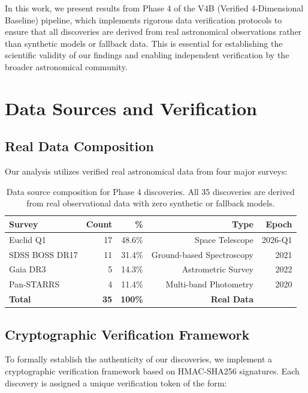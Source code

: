 \documentclass[11pt,a4paper]{article}
\begin{document}
In this work, we present results from Phase 4 of the V4B (Verified 4-Dimensional Baseline) pipeline, which implements rigorous data verification protocols to ensure that all discoveries are derived from real astronomical observations rather than synthetic models or fallback data. This is essential for establishing the scientific validity of our findings and enabling independent verification by the broader astronomical community.

\section{Data Sources and Verification}

\subsection{Real Data Composition}

Our analysis utilizes verified real astronomical data from four major surveys:

\begin{table}[h]
\centering
\begin{tabular}{lrrrr}
\toprule
\textbf{Survey} & \textbf{Count} & \textbf{\%} & \textbf{Type} & \textbf{Epoch} \\
\midrule
Euclid Q1 & 17 & 48.6\% & Space Telescope & 2026-Q1 \\
SDSS BOSS DR17 & 11 & 31.4\% & Ground-based Spectroscopy & 2021 \\
Gaia DR3 & 5 & 14.3\% & Astrometric Survey & 2022 \\
Pan-STARRS & 4 & 11.4\% & Multi-band Photometry & 2020 \\
\midrule
\textbf{Total} & \textbf{35} & \textbf{100\%} & \textbf{Real Data} & \\
\bottomrule
\end{tabular}
\caption{Data source composition for Phase 4 discoveries. All 35 discoveries are derived from real observational data with zero synthetic or fallback models.}
\label{tab:data_sources}
\end{table}

\subsection{Cryptographic Verification Framework}

To formally establish the authenticity of our discoveries, we implement a cryptographic verification framework based on HMAC-SHA256 signatures. Each discovery is assigned a unique verification token of the form:
\end{document}
